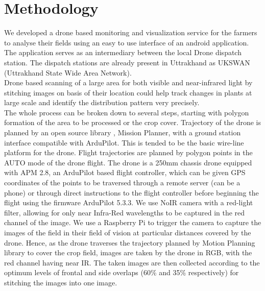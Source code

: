 \chapter{Methodology}
We developed a drone based monitoring and visualization service for the farmers to analyse their fields using an easy to use interface of an android application. The application serves as an intermediary between the local Drone dispatch station. The dispatch stations are already present in Uttrakhand as UKSWAN (Uttrakhand State Wide Area Network).\\ 
Drone based scanning of a large area for both visible and near-infrared light by stitching images on basis of their location could help track changes in plants at large scale and identify the distribution pattern very precisely.\\
The whole process can be broken down to several steps, starting with polygon formation of the area to be processed or the crop cover. Trajectory of the drone is planned by an open source library , Mission Planner, with a ground station interface compatible with ArduPilot. This is tended to be the basic wire-line platform for the drone. Flight trajectories are planned by polygon points in the AUTO mode of the drone flight. The drone is a 250mm chassis drone equipped with APM 2.8, an  ArduPilot based flight controller, which can be given GPS coordinates of the points to be traversed through a remote server (can be a phone) or through direct instructions to the flight controller before beginning the flight using the firmware ArduPilot 5.3.3. We use NoIR camera with a red-light filter, allowing for only near Infra-Red wavelengths to be captured in the red channel of the image. We use a Raspberry Pi to trigger the camera to capture the images of the field in their field of vision at particular distances covered by the drone. Hence, as the drone traverses the trajectory planned by Motion Planning library to cover the crop field, images are taken by the drone in RGB, with the red channel having near IR. 
The taken images are then collected according to the optimum levels of frontal and side overlaps (60\% and 35\% respectively) for stitching the images into one image.\\
